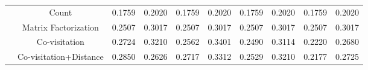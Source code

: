 \begin{table*}[]
\begin{tabular}{|c|c|c|c|c|c|c|c|c|c|}
                       & Count                   & 0.1759        & 0.2020       & 0.1759        & 0.2020       & 0.1759        & 0.2020       & 0.1759        & 0.2020       \\ \cline{2-10} 
                       & Matrix Factorization    & 0.2507        & 0.3017       & 0.2507        & 0.3017       & 0.2507        & 0.3017       & 0.2507        & 0.3017       \\ \cline{2-10} 
                       & Co-visitation           & 0.2724        & 0.3210       & 0.2562        & 0.3401       & 0.2490        & 0.3114       & 0.2220        & 0.2680       \\ \cline{2-10} 
                       & Co-visitation+Distance  & 0.2850        & 0.2626       & 0.2717        & 0.3312       & 0.2529        & 0.3210       & 0.2177        & 0.2725       \\ \hline
\end{tabular}
\end{table*}



